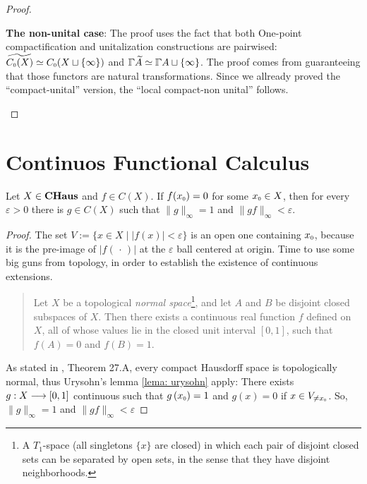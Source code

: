 \begin{teorema}
\begin{proof}
\begin{itroman}
\item \textbf{The non-unital case}: The proof uses the fact that both One-point compactification and unitalization constructions are pairwised: $\widetilde{\sub C0(X)} \simeq \sub C0(X \sqcup \{\infty\})$ and $\GGamma{\widetilde{A}} \simeq {{\GGamma}{A}}\sqcup \{\infty\}$. The proof comes from guaranteeing that those functors are natural transformations. Since we allready proved the ``compact-unital'' version, the ``local compact-non unital'' follows.
\end{itroman}
\end{proof}
\end{teorema}

\section{Continuos Functional Calculus}


\begin{lema}
\label{lema: usando uryshon}
Let $X\in \boldsymbol{\operatorname{CHaus}}$ and $f \in C(X)$. If $f(\sub x{0})=0$ for some $\sub x{0} \in X$, then for every $\varepsilon>0$ there is $g \in C(X)$ such that $ \|g\|_{\infty}=1$ and $\|g f\|_{\infty}<\varepsilon$.
\end{lema}
\begin{proof}
The set $V:=\{x \in X \mid |f(x)|<\varepsilon\}$ is an open one containing $\sub{x}{0}$, because it is the pre-image of $|f(\,\cdot\,)|$ at the $\varepsilon$ ball centered at origin. Time to use some big guns from topology, in order to establish the existence of continuous extensions.
\begin{quote}
    \begin{invocacao}
    \label{lema: urysohn}
    Let $X$ be a topological \textit{normal space}\footnote{A $T_{1}$-space (all singletons $\{x\}$ are closed) in which each pair of disjoint closed sets can be separated by open sets, in the sense that they have disjoint neighborhoods.}, and let $A$ and $B$ be disjoint closed subspaces of $X$. Then there exists a continuous real function $f$ defined on $X$, all of whose values lie in the closed unit interval $[0,1]$, such that $f(A)=0$ and $f(B)=1$.
    \end{invocacao}
\end{quote}
As stated in \cite{simmons1963introduction}, Theorem 27.A, every compact Hausdorff space is topologically normal, thus Urysohn's lemma \ref{lema: urysohn} apply: There exists $g : X \longrightarrow [0,1]$ continuous such that $g\left(\sub{x}{0}\right)=1$ and $g(x)=0$ if $ x \in V_{\neq \sub x0}$. So, $\|g\|_{\infty}=1$ and $\|g f\|_{\infty}<\varepsilon$
\end{proof}

